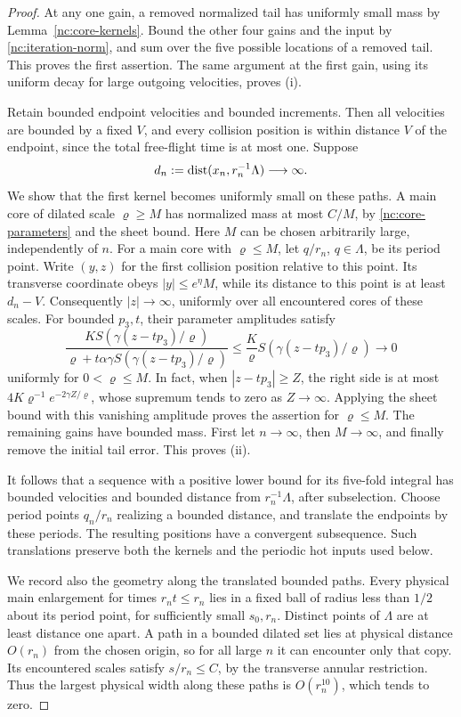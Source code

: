\begin{proof}
At any one gain, a removed normalized tail has uniformly small mass
by Lemma~\ref{nc:core-kernels}. Bound the other four gains and the
input by \eqref{nc:iteration-norm}, and sum over the five possible
locations of a removed tail. This proves the first assertion.
The same argument at the first gain, using its uniform decay for
large outgoing velocities, proves (i).

Retain bounded endpoint velocities and bounded increments. Then all
velocities are bounded by a fixed \(V\), and every collision position
is within distance \(V\) of the endpoint, since the total free-flight
time is at most one. Suppose
\[
 d_n:=\operatorname{dist}(x_n,r_n^{-1}\Lambda)\longrightarrow\infty.
\]
We show that the first kernel becomes uniformly small on these paths.
A main core of dilated scale \(\varrho\ge M\) has normalized mass at
most \(C/M\), by \eqref{nc:core-parameters} and the sheet bound.
Here \(M\) can be chosen arbitrarily large, independently of \(n\).
For a main core with \(\varrho\le M\), let \(q/r_n\), \(q\in\Lambda\),
be its period point. Write \((y,z)\) for the first collision position
relative to this point. Its transverse coordinate obeys
\(|y|\le e^\eta M\), while its distance to this point is at least
\(d_n-V\). Consequently \(|z|\to\infty\), uniformly over all
encountered cores of these scales. For bounded \(p_3,t\), their
parameter amplitudes satisfy
\begin{equation}
\label{nc:axial-escape}
 \frac{K S(\gamma(z-tp_3)/\varrho)}
      {\varrho+t\alpha\gamma S(\gamma(z-tp_3)/\varrho)}
 \le \frac K\varrho S(\gamma(z-tp_3)/\varrho)\longrightarrow0
\end{equation}
uniformly for \(0<\varrho\le M\). In fact, when
\(|z-tp_3|\ge Z\), the right side is at most
\(4K\varrho^{-1}e^{-2\gamma Z/\varrho}\), whose supremum tends to zero
as \(Z\to\infty\). Applying the sheet bound with this vanishing
amplitude proves the assertion for \(\varrho\le M\). The remaining
gains have bounded mass. First let \(n\to\infty\), then
\(M\to\infty\), and finally remove the initial tail error.
This proves (ii).

It follows that a sequence with a positive lower bound for its
five-fold integral has bounded velocities and bounded distance from
\(r_n^{-1}\Lambda\), after subselection. Choose period points
\(q_n/r_n\) realizing a bounded distance, and translate the endpoints
by these periods. The resulting positions have a convergent
subsequence. Such translations preserve both the kernels and the
periodic hot inputs used below.

We record also the geometry along the translated bounded paths.
Every physical main enlargement for times \(r_nt\le r_n\) lies
in a fixed ball of radius less than \(1/2\) about its period point,
for sufficiently small \(s_0,r_n\). Distinct points of \(\Lambda\)
are at least distance one apart. A path in a bounded dilated set
lies at physical distance \(O(r_n)\) from the chosen origin, so
for all large \(n\) it can encounter only that copy. Its encountered
scales satisfy \(s/r_n\le C\), by the transverse annular restriction.
Thus the largest physical width along these paths is
\(O(r_n^{10})\), which tends to zero.
\end{proof}

